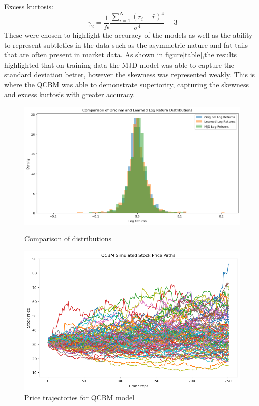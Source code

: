 \documentclass[12pt]{article}
\numberwithin{equation}{section}
\begin{document}
Excess kurtosis:
$$
\gamma_2 = \frac{1}{N}\frac{\sum_{i=1}^{N} (r_i - \bar{r})^4}{\sigma^4} - 3
$$
These 
were chosen to highlight the accuracy of the models as well as the ability to represent 
subtleties in the data such as the asymmetric nature and fat tails that are often 
present in market data. 
As shown in figure[table],the results highlighted that on training data the 
MJD model was able to capture the standard deviation better, however the skewness 
was represented weakly. This is where the QCBM was able to demonstrate superiority, 
capturing the skewness and excess kurtosis with greater accuracy. 
\begin{figure}[h!]
    \centering
    \begin{minipage}{0.48\textwidth}
        \centering
        \includegraphics[width=\linewidth]{compdists.png}
        \caption{Comparison of distributions}
        \label{fig:rollingvol}
    \end{minipage}
    \hfill
    \begin{minipage}{0.48\textwidth}
        \centering
        \includegraphics[width=\linewidth]{pricepath2.png}
        \caption{Price trajectories for QCBM model}
        \label{fig:weeklyvol}
    \end{minipage}
\end{figure}
\end{document}
